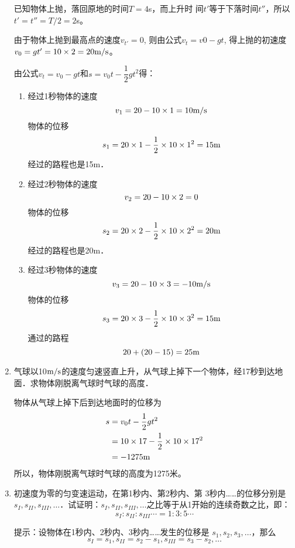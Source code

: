 \begin{enumerate}
    \begin{solution}
已知物体上抛，落回原地的时间$T=4$s，而上升时
间$t'$等于下落时间$t''$，所以$t'=t''=T/2=2$s。

由于物体上抛到最高点的速度$v_{t'}=0$, 则由公式$v_t=v0
-gt$, 得上抛的初速度$v_0=gt'=10\times2=20\text{m}/\text{s}$。

由公式$v_t=v_0-gt$和$s=v_0t-\dfrac{1}{2}gt^2$得：
\begin{enumerate}
    \item 经过1秒物体的速度
    $$v_1=20-10\times1=10\text{m}/\text{s}$$
    物体的位移
    $$s_1=20\times1-\frac{1}{2}\times 10\times1^2=15{\rm m}$$
    经过的路程也是15m．
\item 经过2秒物体的速度
\[v_2=20-10\times2=0\]
物体的位移
\[s_2=20\times 2-\frac{1}{2}\times 10\times 2^2=20{\rm m}\]
经过的路程也是20m．
\item 经过3秒物体的速度
\[v_3=20-10\times3=-10\text{m}/\text{s}\]
物体的位移
\[s_3=20\times3-\frac{1}{2}\times 10\times3^2=15{\rm m}\]
通过的路程
\[20+(20-15)=25{\rm m}\]
\end{enumerate}

    \end{solution}
	\item 气球以10$\text{m}/\text{s}$的速度匀速竖直上升，从气球上掉下一个物体，经17秒到达地面．求物体刚脱离气球时气球的高度．

    \begin{solution}
        物体从气球上掉下后到达地面时的位移为
\[\begin{split}
    s&=v_0t-\frac{1}{2}gt^2\\
    &=10\times 17-\frac{1}{2}\times 10\times 17^2\\
    &=-1275{\rm m}
\end{split}\]
所以，物体刚脱离气球时气球的高度为1275米。
    \end{solution}
	\item 初速度为零的匀变速运动，在第1秒内、第2秒内、第
	3秒内……的位移分别是$s_I,s_{II},s_{III},\ldots$．试证明：$s_I,s_{II},s_{III},\ldots$之比等于从1开始的连续奇数之比，即：
$$s_I:s_{II}:s_{III}\cdots=1:3:5\cdots$$

提示：设物体在1秒内、2秒内、3秒内……发生的位移是
$s_1,s_2,s_3,\ldots$，那么
$$s_I=s_1, s_{II}=s_2-s_1, s_{III}=s_3-s_2,\ldots$$


\end{enumerate}
